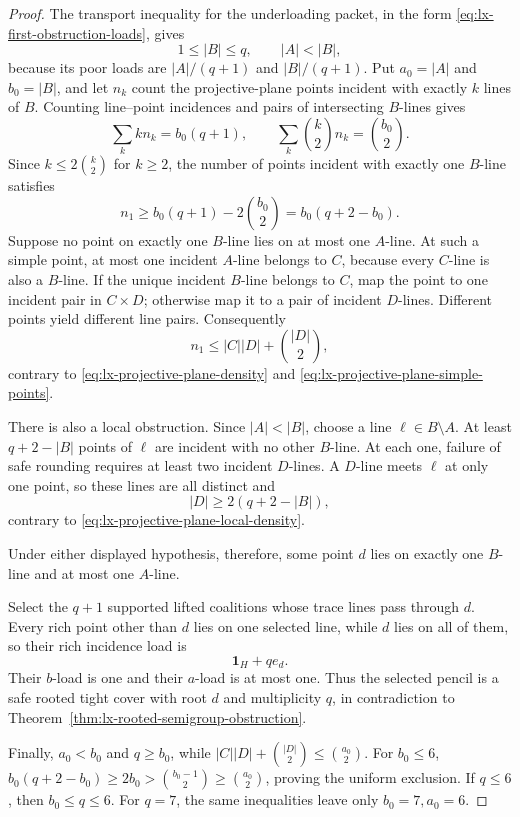\begin{proof}
The transport inequality for the underloading packet, in the form
\eqref{eq:lx-first-obstruction-loads}, gives
\[
 1\leq |B|\leq q,\qquad |A|<|B|,                  \tag{PP-1}
 \label{eq:lx-projective-plane-poor-counts}
\]
because its poor loads are $|A|/(q+1)$ and $|B|/(q+1)$.  Put
$a_0=|A|$ and $b_0=|B|$, and let $n_k$ count the projective-plane points
incident with exactly $k$ lines of $B$.  Counting line--point incidences and
pairs of intersecting $B$-lines gives
\[
 \sum_k k n_k=b_0(q+1),\qquad
 \sum_k\binom{k}{2}n_k=\binom{b_0}{2}.
\]
Since $k\leq2\binom{k}{2}$ for $k\geq2$, the number of points incident with
exactly one $B$-line satisfies
\[
 n_1\geq b_0(q+1)-2\binom{b_0}{2}=b_0(q+2-b_0).
 \tag{PP-2}\label{eq:lx-projective-plane-simple-points}
\]
Suppose no point on exactly one $B$-line lies on at most one $A$-line.  At
such a simple point, at most one incident $A$-line belongs to $C$, because
every $C$-line is also a $B$-line.  If the unique incident $B$-line belongs
to $C$, map the point to one incident pair in $C\times D$; otherwise map it
to a pair of incident $D$-lines.  Different points yield different line
pairs.  Consequently
\[
 n_1\leq |C||D|+\binom{|D|}{2},                    \tag{PP-2a}
 \label{eq:lx-projective-plane-overlap-bound}
\]
contrary to \eqref{eq:lx-projective-plane-density} and
\eqref{eq:lx-projective-plane-simple-points}.

There is also a local obstruction.  Since $|A|<|B|$, choose a line
$\ell\in B\setminus A$.  At least $q+2-|B|$ points of $\ell$ are incident
with no other $B$-line.  At each one, failure of safe rounding requires at
least two incident $D$-lines.  A $D$-line meets $\ell$ at only one point, so
these lines are all distinct and
\[
 |D|\geq2(q+2-|B|),
\]
contrary to \eqref{eq:lx-projective-plane-local-density}.

Under either displayed hypothesis, therefore, some point $d$ lies on
exactly one $B$-line and at most one $A$-line.

Select the $q+1$ supported lifted coalitions whose trace lines pass through
$d$.  Every rich point other than $d$ lies on one selected line, while $d$
lies on all of them, so their rich incidence load is
\[
 \mathbf1_H+q e_d.                                  \tag{PP-3}
 \label{eq:lx-projective-plane-star}
\]
Their $b$-load is one and their $a$-load is at most one.  Thus the selected
pencil is a safe rooted tight cover with root $d$ and multiplicity $q$, in
contradiction to
Theorem~\ref{thm:lx-rooted-semigroup-obstruction}.

Finally, $a_0<b_0$ and $q\geq b_0$, while
$|C||D|+\binom{|D|}{2}\leq\binom{a_0}{2}$.  For $b_0\leq6$,
$b_0(q+2-b_0)\geq2b_0>\binom{b_0-1}{2}\geq
\binom{a_0}{2}$, proving the uniform exclusion.  If $q\leq6$, then
$b_0\leq q\leq6$.  For $q=7$, the same inequalities leave only
$b_0=7,a_0=6$.
\end{proof}

